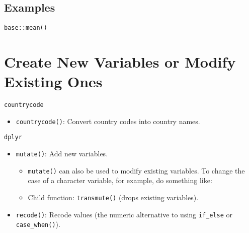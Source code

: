 \documentclass[
]{book}
\newenvironment{Shaded}{\begin{snugshade}}{\end{snugshade}}
\newcommand{\DataTypeTok}[1]{\textcolor[rgb]{0.13,0.29,0.53}{#1}}
\newcommand{\DecValTok}[1]{\textcolor[rgb]{0.00,0.00,0.81}{#1}}
\newcommand{\KeywordTok}[1]{\textcolor[rgb]{0.13,0.29,0.53}{\textbf{#1}}}
\newcommand{\NormalTok}[1]{#1}
\newcommand{\OperatorTok}[1]{\textcolor[rgb]{0.81,0.36,0.00}{\textbf{#1}}}
\newcommand{\StringTok}[1]{\textcolor[rgb]{0.31,0.60,0.02}{#1}}
\providecommand{\tightlist}{%
  \setlength{\itemsep}{0pt}\setlength{\parskip}{0pt}}
\begin{document}
\hypertarget{examples-3}{%
\subsection{Examples}\label{examples-3}}

\texttt{base::mean()}

\begin{Shaded}
\end{Shaded}

\hypertarget{create-new-variables-or-modify-existing-ones}{%
\section{Create New Variables or Modify Existing Ones}\label{create-new-variables-or-modify-existing-ones}}

\texttt{countrycode}

\begin{itemize}
\tightlist
\item
  \texttt{countrycode()}: Convert country codes into country names.
\end{itemize}

\texttt{dplyr}

\begin{itemize}
\tightlist
\item
  \texttt{mutate()}: Add new variables.

  \begin{itemize}
  \tightlist
  \item
    \texttt{mutate()} can also be used to modify existing variables. To change the case of a character variable, for example, do something like:
  \item
    Child function: \texttt{transmute()} (drops existing variables).
  \end{itemize}
\item
  \texttt{recode()}: Recode values (the numeric alternative to using \texttt{if\_else} or \texttt{case\_when()}).
\end{itemize}
\end{document}
